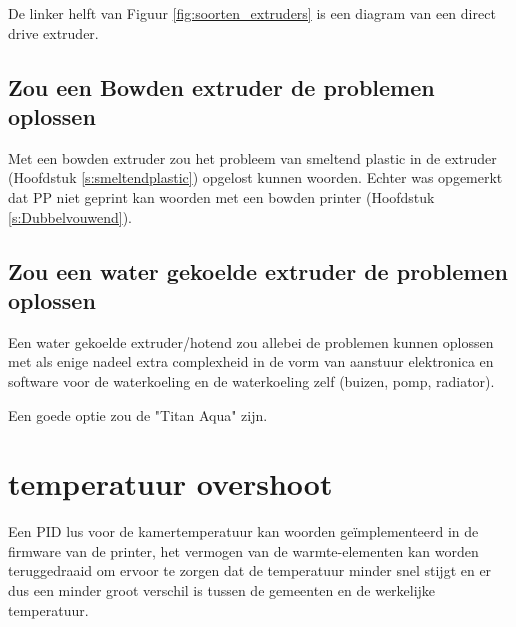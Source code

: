 De linker helft van Figuur \ref{fig:soorten_extruders} \cite{soorten_extruders}
is een diagram van een direct drive extruder.


\subsection{Zou een Bowden extruder de problemen oplossen}

Met een bowden extruder zou het probleem van smeltend plastic in de extruder
(Hoofdstuk \ref{s:smeltendplastic}) opgelost kunnen woorden. Echter was
opgemerkt dat PP niet geprint kan woorden met een bowden printer (Hoofdstuk
\ref{s:Dubbelvouwend}).

\subsection{Zou een water gekoelde extruder de problemen oplossen}

Een water gekoelde extruder/hotend zou allebei de problemen kunnen oplossen met
als enige nadeel extra complexheid in de vorm van aanstuur elektronica en
software voor de waterkoeling en de waterkoeling zelf (buizen, pomp, radiator).

Een goede optie zou de "Titan Aqua" \cite{titanaqua} zijn.


\section{temperatuur overshoot}

Een \ac{PID} lus voor de kamertemperatuur kan woorden geïmplementeerd in de
firmware van de printer, het vermogen van de warmte-elementen kan worden
teruggedraaid om ervoor te zorgen dat de temperatuur minder snel stijgt en er
dus een minder groot verschil is tussen de gemeenten en de werkelijke
temperatuur.

